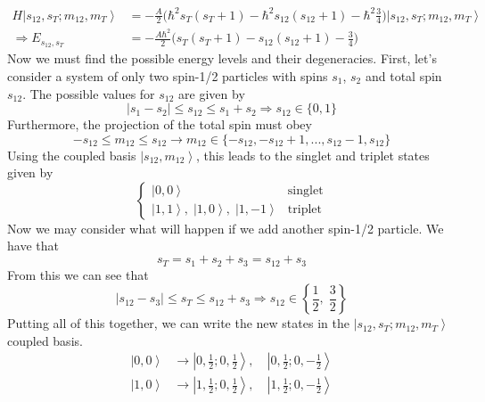 \documentclass[a4paper, 11pt]{article}
\newcommand{\ket}[1]{\ensuremath{\left|#1\right\rangle}}
\newenvironment{solution}{%
	\begin{list}{}{%
			\setlength{\topsep}{0pt}%
			\setlength{\leftmargin}{0.5cm}%
			\setlength{\rightmargin}{0.5cm}%
			\setlength{\listparindent}{\parindent}%
			\setlength{\itemindent}{\parindent}%
			\setlength{\parsep}{\parskip}%
		}%
		\item[]}{\end{list}}
\begin{document}
\begin{enumerate}[leftmargin=0em]
\begin{solution}
      \begin{align}
        H\ket{s_{12}, s_T ; m_{12}, m_T} &= -\frac{A}{2}\Big(\hbar^2s_T(s_T+1)-\hbar^2s_{12}(s_{12}+1)-\hbar^2\frac{3}{4}\Big) \ket{s_{12}, s_T ; m_{12}, m_T}\\
        \Rightarrow E_{s_{12},s_T} &= -\frac{A\hbar^2}{2}\Big(s_T(s_T+1)-s_{12}(s_{12}+1)-\frac{3}{4}\Big)
      \end{align}
      Now we must find the possible energy levels and their degeneracies. First,
      let's consider a system of only two spin-1/2 particles with spins $s_1$,
      $s_2$ and total spin $s_{12}$. The possible values for $s_{12}$ are given
      by
      \begin{equation}
        |s_1-s_2|\leq s_{12}\leq s_1+s_2 \Rightarrow s_{12}\in\{0, 1\}
      \end{equation}
      Furthermore, the projection of the total spin must obey
      \begin{equation}
        -s_{12}\leq m_{12}\leq s_{12} \rightarrow m_{12}\in\{-s_{12}, -s_{12}+1, ..., s_{12}-1, s_{12}\}
        \end{equation}
        Using the coupled basis $\ket{s_{12},m_{12}}$, this leads to the singlet and triplet states given by
        \begin{equation}
          \begin{cases}
            \ket{0,0} &\text{singlet} \\
            \ket{1,1},\;\ket{1,0},\;\ket{1,-1} &\text{triplet}
          \end{cases}
        \end{equation}
       Now we may consider what will happen if we add another spin-1/2 particle.
       We have that
       \begin{equation}
         s_T = s_1+s_2+s_3 = s_{12}+s_3
       \end{equation}
       From this we can see that
       \begin{equation}
         |s_{12}-s_3|\leq s_T \leq s_{12}+s_3 \Rightarrow s_{12}\in\left\{\frac{1}{2},\;\frac{3}{2}\right\}
       \end{equation}
       Putting all of this together, we can write the new states in the
       $\ket{s_{12},s_T;m_{12},m_T}$ coupled basis.
       \begin{align}
         \ket{0,0}&\longrightarrow \ket{0, \frac{1}{2};0, \frac{1}{2}},\quad \ket{0,\frac{1}{2};0,-\frac{1}{2} }\\
         \ket{1,0}&\longrightarrow \ket{1, \frac{1}{2};0, \frac{1}{2}},\quad \ket{1,\frac{1}{2};0,-\frac{1}{2}}\\

\end{align}
\end{solution}
\end{enumerate}
\end{document}
